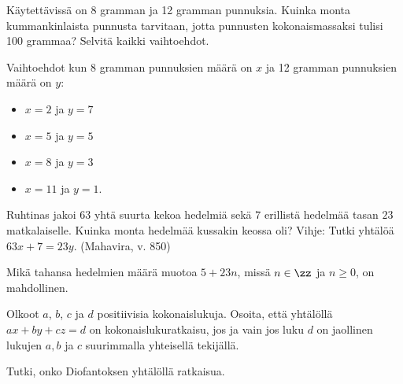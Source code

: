 \begin{tehtava}
    Käytettävissä on 8 gramman ja 12 gramman punnuksia. Kuinka monta kummankinlaista punnusta tarvitaan, jotta punnusten kokonaismassaksi tulisi 100 grammaa? Selvitä kaikki vaihtoehdot.
    
    \begin{vastaus}
        Vaihtoehdot kun 8 gramman punnuksien määrä on $x$ ja 12 gramman punnuksien määrä on $y$:
        \begin{itemize}
            \item $x = 2$ ja $y = 7$
            \item $x = 5$ ja $y = 5$
            \item $x = 8$ ja $y = 3$
            \item $x = 11$ ja $y = 1$.
        \end{itemize}
    \end{vastaus}
    
\end{tehtava}

\begin{tehtava}
    Ruhtinas jakoi $63$ yhtä suurta kekoa hedelmiä sekä $7$ erillistä hedelmää tasan $23$ matkalaiselle. Kuinka monta hedelmää kussakin keossa oli? Vihje: Tutki yhtälöä $63x + 7 = 23y$. (Mahavira, v. 850)
    
    \begin{vastaus}
        Mikä tahansa hedelmien määrä muotoa $5 + 23n$, missä $n\in\zz$ ja $n\geq 0$, on mahdollinen.
    \end{vastaus}
    
\end{tehtava}

\begin{tehtava}
    Olkoot $a$, $b$, $c$ ja $d$ positiivisia kokonaislukuja. Osoita, että yhtälöllä $ax+by+cz=d$ on kokonaislukuratkaisu, jos ja vain jos luku $d$ on jaollinen lukujen $a, b$ ja $c$ suurimmalla yhteisellä tekijällä.
\end{tehtava}



\begin{tehtava}
    Tutki, onko Diofantoksen yhtälöllä ratkaisua.
    
    \begin{alakohdat}
    \end{alakohdat}

    \begin{vastaus}
        \begin{alakohdat}
        \end{alakohdat}
    \end{vastaus}
    
\end{tehtava}

